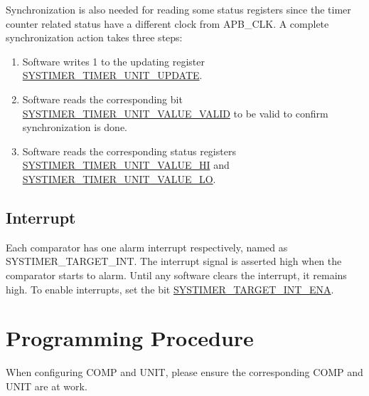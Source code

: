 \documentclass[main\_\_EN.tex]{subfiles}
\begin{document}
Synchronization is also needed for reading some status registers since the timer counter related status have a different clock from APB\_CLK. A complete synchronization action takes three steps:
\begin{enumerate}
    \item Software writes 1 to the updating register \hyperref[fielddesc:SYSTIMERTIMERUNIT0UPDATE]{SYSTIMER\_TIMER\_UNIT\_UPDATE}.
    \item Software reads the corresponding bit \hyperref[fielddesc:SYSTIMERTIMERUNIT0VALUEVALID]{SYSTIMER\_TIMER\_UNIT\_VALUE\_VALID} to be valid to confirm synchronization is done.
    \item Software reads the corresponding status registers \hyperref[fielddesc:SYSTIMERTIMERUNIT0VALUEHI]{SYSTIMER\_TIMER\_UNIT\_VALUE\_HI} and \hyperref[fielddesc:SYSTIMERTIMERUNIT0VALUELO]{SYSTIMER\_TIMER\_UNIT\_VALUE\_LO}.
\end{enumerate}

\subsection{Interrupt}
Each comparator has one alarm interrupt respectively, named as SYSTIMER\_TARGET\_INT. The interrupt signal is asserted high when the comparator starts to alarm. Until any software clears the interrupt, it remains high. To enable interrupts, set the bit \hyperref[fielddesc:SYSTIMERTARGET0INTENA]{SYSTIMER\_TARGET\_INT\_ENA}.



\section{Programming Procedure}\label{sec:instructions-of-usage}
When configuring COMP and UNIT, please ensure the corresponding COMP and UNIT are at work.
\end{document}
